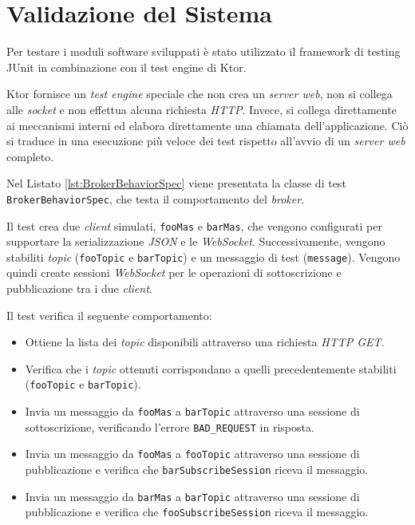 \section{Validazione del Sistema}
Per testare i moduli software sviluppati è stato utilizzato il framework di testing JUnit in combinazione con il test engine di Ktor.

Ktor fornisce un \textit{test engine} speciale che non crea un \textit{server web}, non si collega alle \textit{socket} e non effettua alcuna richiesta \textit{HTTP}. Invece, si collega direttamente ai meccanismi interni ed elabora direttamente una chiamata dell'applicazione. Ciò si traduce in una esecuzione più veloce dei test rispetto all'avvio di un \textit{server web} completo.

Nel Listato \ref{lst:BrokerBehaviorSpec} viene presentata la classe di test \texttt{BrokerBehaviorSpec}, che testa il comportamento del \textit{broker}.

Il test crea due \textit{client} simulati, \texttt{fooMas} e \texttt{barMas}, che vengono configurati per supportare la serializzazione \textit{JSON} e le \textit{WebSocket}. Successivamente, vengono stabiliti \textit{topic} (\texttt{fooTopic} e \texttt{barTopic}) e un messaggio di test (\texttt{message}). Vengono quindi create sessioni \textit{WebSocket} per le operazioni di sottoscrizione e pubblicazione tra i due \textit{client}.

Il test verifica il seguente comportamento:

\begin{itemize}
    \item Ottiene la lista dei \textit{topic} disponibili attraverso una richiesta \textit{HTTP GET}.
    \item Verifica che i \textit{topic} ottenuti corrispondano a quelli precedentemente stabiliti (\texttt{fooTopic} e \texttt{barTopic}).
    \item Invia un messaggio da \texttt{fooMas} a \texttt{barTopic} attraverso una sessione di sottoscrizione, verificando l'errore \texttt{BAD\_REQUEST} in risposta.
    \item Invia un messaggio da \texttt{fooMas} a \texttt{fooTopic} attraverso una sessione di pubblicazione e verifica che \texttt{barSubscribeSession} riceva il messaggio.
    \item Invia un messaggio da \texttt{barMas} a \texttt{barTopic} attraverso una sessione di pubblicazione e verifica che \texttt{fooSubscribeSession} riceva il messaggio.
\end{itemize}

